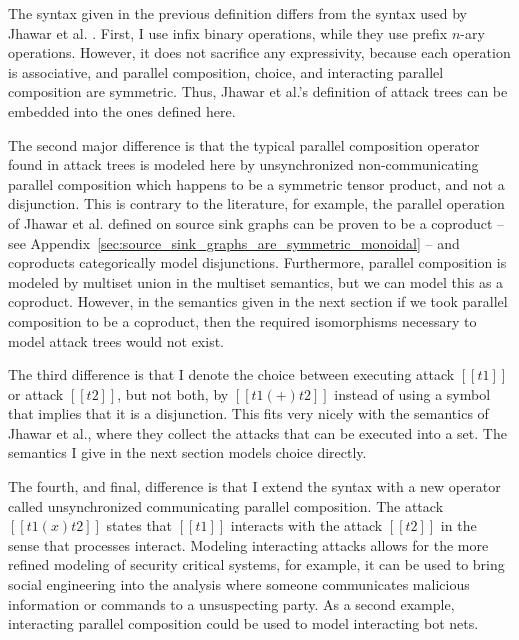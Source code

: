 \documentclass{sigplanconf}
\begin{document}
The syntax given in the previous definition differs from the syntax
used by Jhawar et al. \cite{Jhawar:2015}.  First, I use infix binary
operations, while they use prefix $n$-ary operations. However, it does
not sacrifice any expressivity, because each operation is associative,
and parallel composition, choice, and interacting parallel composition
are symmetric.  Thus, Jhawar et al.'s definition of attack trees can
be embedded into the ones defined here.%

The second major difference is that the typical parallel composition
operator found in attack trees is modeled here by unsynchronized
non-communicating parallel composition which happens to be a symmetric
tensor product, and not a disjunction.  This is contrary to the
literature, for example, the parallel operation of Jhawar et
al. defined on source sink graphs \cite{Jhawar:2015} can be proven to
be a coproduct -- see
Appendix~\ref{sec:source_sink_graphs_are_symmetric_monoidal} -- and
coproducts categorically model disjunctions.  Furthermore, parallel
composition is modeled by multiset union in the multiset semantics,
but we can model this as a coproduct.  However, in the semantics given
in the next section if we took parallel composition to be a coproduct,
then the required isomorphisms necessary to model attack trees would
not exist.

The third difference is that I denote the choice between executing
attack $[[t1]]$ or attack $[[t2]]$, but not both, by $[[t1 (+) t2]]$
instead of using a symbol that implies that it is a disjunction.  This
fits very nicely with the semantics of Jhawar et al., where they
collect the attacks that can be executed into a set.  The semantics I
give in the next section models choice directly.

The fourth, and final, difference is that I extend the syntax with a
new operator called unsynchronized communicating parallel composition.
The attack $[[t1 (x) t2]]$ states that $[[t1]]$ interacts with the
attack $[[t2]]$ in the sense that processes interact.  Modeling
interacting attacks allows for the more refined modeling of security
critical systems, for example, it can be used to bring social
engineering into the analysis where someone communicates malicious
information or commands to a unsuspecting party.  As a second example,
interacting parallel composition could be used to model interacting
bot nets.
\end{document}
